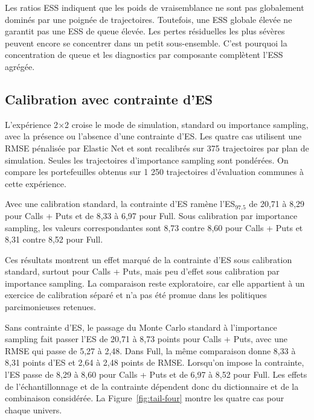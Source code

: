 Les ratios ESS indiquent que les poids de vraisemblance ne sont pas globalement dominés par une poignée de trajectoires. Toutefois, une ESS globale élevée ne garantit pas une ESS de queue élevée. Les pertes résiduelles les plus sévères peuvent encore se concentrer dans un petit sous-ensemble. C'est pourquoi la concentration de queue et les diagnostics par composante complètent l'ESS agrégée.

\subsection{Calibration avec contrainte d'ES}

L'expérience 2$\times$2 croise le mode de simulation, standard ou importance sampling, avec la présence ou l'absence d'une contrainte d'ES. Les quatre cas utilisent une RMSE pénalisée par Elastic Net et sont recalibrés sur 375 trajectoires par plan de simulation. Seules les trajectoires d'importance sampling sont pondérées. On compare les portefeuilles obtenus sur 1 250 trajectoires d'évaluation communes à cette expérience.

Avec une calibration standard, la contrainte d'ES ramène l'ES$_{97.5}$ de 20,71 à 8,29 pour Calls + Puts et de 8,33 à 6,97 pour Full. Sous calibration par importance sampling, les valeurs correspondantes sont 8,73 contre 8,60 pour Calls + Puts et 8,31 contre 8,52 pour Full.

Ces résultats montrent un effet marqué de la contrainte d'ES sous calibration standard, surtout pour Calls + Puts, mais peu d'effet sous calibration par importance sampling. La comparaison reste exploratoire, car elle appartient à un exercice de calibration séparé et n'a pas été promue dans les politiques parcimonieuses retenues.

Sans contrainte d'ES, le passage du Monte Carlo standard à l'importance sampling fait passer l'ES de 20,71 à 8,73 points pour Calls + Puts, avec une RMSE qui passe de 5,27 à 2,48. Dans Full, la même comparaison donne 8,33 à 8,31 points d'ES et 2,64 à 2,48 points de RMSE. Lorsqu'on impose la contrainte, l'ES passe de 8,29 à 8,60 pour Calls + Puts et de 6,97 à 8,52 pour Full. Les effets de l'échantillonnage et de la contrainte dépendent donc du dictionnaire et de la combinaison considérée. La Figure~\ref{fig:tail-four} montre les quatre cas pour chaque univers.


